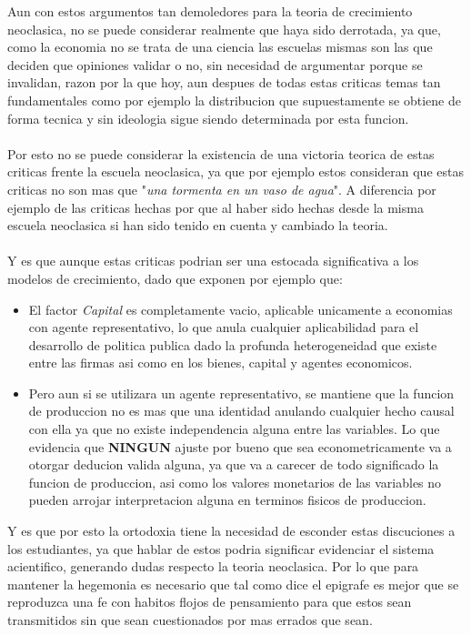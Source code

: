 \documentclass[11pt]{article}
\begin{document}
\begin{flushleft}
    Aun con estos argumentos tan demoledores para la teoria de crecimiento neoclasica, no se puede considerar
    realmente que haya sido derrotada, ya que, como la economia no se trata de una ciencia las escuelas mismas
    son las que deciden que opiniones validar o no, sin necesidad de argumentar porque se invalidan, razon por la que hoy,
    aun despues de todas estas criticas temas tan fundamentales como por ejemplo la distribucion que supuestamente se obtiene de forma tecnica y sin ideologia
    sigue siendo determinada por esta funcion.
    \\~\\
    Por esto no se puede considerar la existencia de una victoria
    teorica de estas criticas frente la escuela neoclasica, ya que por ejemplo estos 
    consideran que estas criticas no son mas que "\textit{una tormenta en un vaso de agua}".
    A diferencia por ejemplo de las criticas hechas por \citet{sonnenschein_1972} que al haber sido hechas
    desde la misma escuela neoclasica si han sido tenido en cuenta y cambiado la teoria.
    \\~\\
    Y es que aunque estas criticas podrian ser una estocada significativa a los modelos de crecimiento, 
    dado que exponen por ejemplo que:
    \begin{itemize}
        \item El factor \textit{Capital} es completamente vacio, aplicable unicamente a economias
        con agente representativo, lo que anula cualquier aplicabilidad para el desarrollo de politica publica
        dado la profunda heterogeneidad que existe entre las firmas asi como en los bienes, capital y agentes economicos.
        \item Pero aun si se utilizara un agente representativo, se mantiene que la funcion de produccion no es mas que una identidad
        anulando cualquier hecho causal con ella ya que no existe independencia alguna entre las variables. 
        Lo que evidencia que \textbf{NINGUN} ajuste por bueno que sea econometricamente va a otorgar deducion valida alguna, ya que 
        va a carecer de todo significado la funcion de produccion, asi como los valores monetarios de las variables no pueden arrojar
        interpretacion alguna en terminos fisicos de produccion.
    \end{itemize}
    Y es que por esto la ortodoxia tiene la necesidad de esconder estas discuciones a los estudiantes, ya que 
    hablar de estos podria significar evidenciar el sistema acientifico, generando dudas respecto la teoria neoclasica.
    Por lo que para mantener la hegemonia es necesario que tal como dice el epigrafe es mejor que se reproduzca una fe con habitos flojos de pensamiento
     para que estos sean transmitidos sin que sean cuestionados por mas errados que sean.

\end{flushleft}
\end{document}
